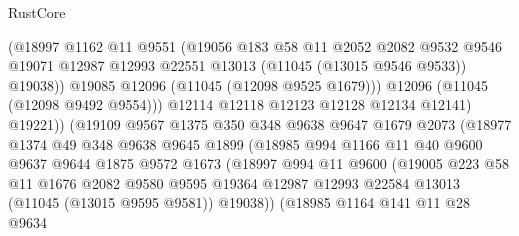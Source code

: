 \begin{lexlean}{RustCore}
\begin{coremodule}
                          (@18997
                            @1162
                            @11
                            @9551
                            (@19056
                              @183
                              @58
                              @11
                              @2052
                              @2082
                              @9532
                              @9546
                              @19071
                              @12987
                              @12993
                              @22551
                              @13013
                              (@11045 (@13015 @9546 @9533))
                              @19038))
                          @19085
                          @12096
                          (@11045 (@12098 @9525 @1679)))
                        @12096
                        (@11045 (@12098 @9492 @9554)))
                      @12114
                      @12118
                      @12123
                      @12128
                      @12134
                      @12141)
                    @19221))
                (@19109
                  @9567
                  @1375
                  @350
                  @348
                  @9638
                  @9647
                  @1679
                  @2073
                  (@18977
                    @1374
                    @49
                    @348
                    @9638
                    @9645
                    @1899
                    (@18985
                      @994
                      @1166
                      @11
                      @40
                      @9600
                      @9637
                      @9644
                      @1875
                      @9572
                      @1673
                      (@18997
                        @994
                        @11
                        @9600
                        (@19005
                          @223
                          @58
                          @11
                          @1676
                          @2082
                          @9580
                          @9595
                          @19364
                          @12987
                          @12993
                          @22584
                          @13013
                          (@11045 (@13015 @9595 @9581))
                          @19038))
                      (@18985
                        @1164
                        @141
                        @11
                        @28
                        @9634

\end{coremodule}
\end{lexlean}
